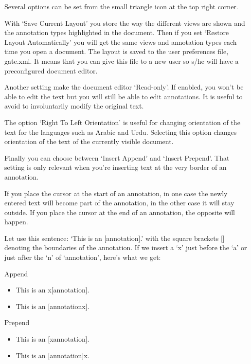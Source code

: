 Several options can be set from the small triangle icon at the top right
corner.

With `Save Current Layout' you store the way the different views are shown
and the annotation types highlighted in the document. Then if you set
`Restore Layout Automatically' you will get the same views and annotation
types each time you open a document. The layout is saved to the user
preferences file, gate.xml. It means that you can give this file to a new
user so s/he will have a preconfigured document editor.

Another setting make the document editor `Read-only'. If enabled, you won't
be able to edit the text but you will still be able to edit annotations. It
is useful to avoid to involuntarily modify the original text.

The option `Right To Left Orientation' is useful for changing orientation of
the text for the languages such as Arabic and Urdu.  Selecting this option 
changes orientation of the text of the currently visible document.

Finally you can choose between `Insert Append' and `Insert Prepend'.  That
setting is only relevant when you're inserting text at the very border of an
annotation.

If you place the cursor at the start of an annotation, in one case the newly
entered text will become part of the annotation, in the other case it will
stay outside. If you place the cursor at the end of an annotation, the
opposite will happen.

Let use this sentence: `This is an [annotation].' with the square brackets []
denoting the boundaries of the annotation. If we insert a `x' just before
the `a' or just after the `n' of `annotation', here's what we get:

Append
\begin{itemize}
\item This is an x[annotation].
\item This is an [annotationx].
\end{itemize}

Prepend
\begin{itemize}
\item This is an [xannotation].
\item This is an [annotation]x.
\end{itemize}

